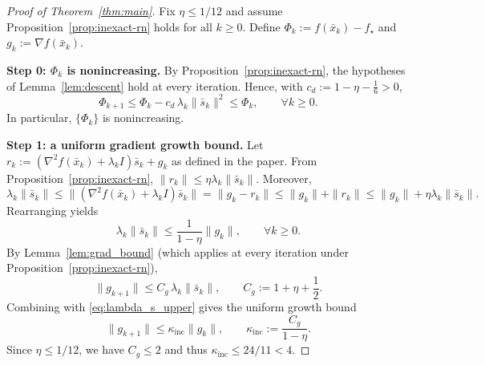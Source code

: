 \documentclass[11pt,a4paper]{article}
\begin{document}
\begin{proof}[Proof of Theorem~\ref{thm:main}]
Fix $\eta\le 1/12$ and assume Proposition~\ref{prop:inexact-rn} holds for all $k\ge 0$.
Define $\Phi_k:=f(\bar x_k)-f_\star$ and $g_k:=\nabla f(\bar x_k)$.

\smallskip
\noindent\textbf{Step 0: $\Phi_k$ is nonincreasing.}
By Proposition~\ref{prop:inexact-rn}, the hypotheses of Lemma~\ref{lem:descent} hold at every iteration.
Hence, with $c_d:=1-\eta-\frac16>0$,
\begin{equation}\label{eq:Phi_monotone}
\Phi_{k+1}\le \Phi_k - c_d\,\lambda_k\|\bar s_k\|^2\le \Phi_k,
\qquad \forall k\ge 0.
\end{equation}
In particular, $\{\Phi_k\}$ is nonincreasing.

\smallskip
\noindent\textbf{Step 1: a uniform gradient growth bound.}
Let $r_k:=(\nabla^2 f(\bar x_k)+\lambda_k I)\bar s_k+g_k$ as defined in the paper.
From Proposition~\ref{prop:inexact-rn}, $\|r_k\|\le \eta\lambda_k\|\bar s_k\|$.
Moreover,
\[
\lambda_k\|\bar s_k\|
\le \|(\nabla^2 f(\bar x_k)+\lambda_k I)\bar s_k\|
=\|g_k-r_k\|
\le \|g_k\|+\|r_k\|
\le \|g_k\|+\eta\lambda_k\|\bar s_k\|.
\]
Rearranging yields
\begin{equation}\label{eq:lambda_s_upper}
\lambda_k\|\bar s_k\|\le \frac{1}{1-\eta}\|g_k\|,\qquad \forall k\ge 0.
\end{equation}
By Lemma~\ref{lem:grad_bound} (which applies at every iteration under Proposition~\ref{prop:inexact-rn}),
\[
\|g_{k+1}\|\le C_g\,\lambda_k\|\bar s_k\|,
\qquad
C_g:=1+\eta+\frac12.
\]
Combining with \eqref{eq:lambda_s_upper} gives the uniform growth bound
\begin{equation}\label{eq:grad_growth}
\|g_{k+1}\|\le \kappa_{\mathrm{inc}}\|g_k\|,
\qquad
\kappa_{\mathrm{inc}}:=\frac{C_g}{1-\eta}.
\end{equation}
Since $\eta\le 1/12$, we have $C_g\le 2$ and thus $\kappa_{\mathrm{inc}}\le 24/11<4$.


\end{proof}
\end{document}
